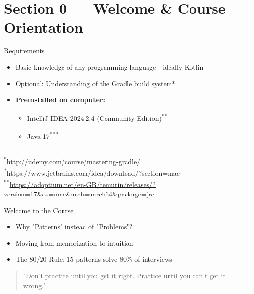 \section{Section 0 — Welcome \& Course Orientation}

\begin{frame}[c]{\empty}
    \begin{center}
        \Large\textbf{\secname}
    \end{center}
\end{frame}

\begin{frame}{Requirements}
  \begin{itemize}
    \item Basic knowledge of any programming language - ideally Kotlin
    \item Optional: Understanding of the Gradle build system{*}
    \item \textbf{Preinstalled on computer:}
      \begin{itemize}
        \item IntelliJ IDEA 2024.2.4 (Community Edition)\textsuperscript{**}
        \item Java 17\textsuperscript{***}
      \end{itemize}
  \end{itemize}

  \vspace{2.0cm}
  \hrule
  \vspace{0.3cm}
  \tiny
  \textsuperscript{*}\href{Gradle course}{http://udemy.com/course/mastering-gradle/} \\
  \textsuperscript{*}\href{https://www.jetbrains.com/idea/download/?section=mac}{https://www.jetbrains.com/idea/download/?section=mac} \\
  \textsuperscript{**}\href{https://adoptium.net/en-GB/temurin/releases/?version=17&os=mac&arch=aarch64&package=jre}{https://adoptium.net/en-GB/temurin/releases/?version=17\&os=mac\&arch=aarch64\&package=jre} \\
\end{frame}

\begin{frame}{Welcome to the Course}
  \begin{itemize}
    \item Why "Patterns" instead of "Problems"? 
    \item Moving from memorization to intuition 
    \item The 80/20 Rule: 15 patterns solve 80\% of interviews 
  \end{itemize}
  
  \vspace{1cm}
  \begin{quote}
    "Don't practice until you get it right. Practice until you can't get it wrong."
  \end{quote}
\end{frame}


